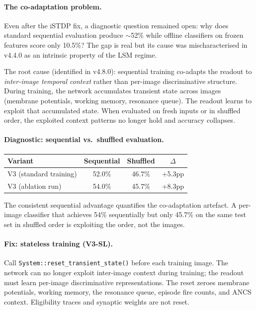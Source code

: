 \paragraph{The co-adaptation problem.}
Even after the iSTDP fix, a diagnostic question remained open: why does standard sequential evaluation produce $\sim$52\% while offline classifiers on frozen features score only 10.5\%? The gap is real but its cause was mischaracterised in v4.4.0 as an intrinsic property of the LSM regime.

The root cause (identified in v4.8.0): sequential training co-adapts the readout to \emph{inter-image temporal context} rather than per-image discriminative structure. During training, the network accumulates transient state across images (membrane potentials, working memory, resonance queue). The readout learns to exploit that accumulated state. When evaluated on fresh inputs or in shuffled order, the exploited context patterns no longer hold and accuracy collapses.

\paragraph{Diagnostic: sequential vs.\ shuffled evaluation.}

\begin{center}
\begin{tabular}{lccc}
\hline
Variant & Sequential & Shuffled & $\Delta$ \\
\hline
V3 (standard training) & 52.0\% & 46.7\% & +5.3pp \\
V3 (ablation run)      & 54.0\% & 45.7\% & +8.3pp \\
\hline
\end{tabular}
\end{center}

The consistent sequential advantage quantifies the co-adaptation artefact. A per-image classifier that achieves 54\% sequentially but only 45.7\% on the same test set in shuffled order is exploiting the order, not the images.

\paragraph{Fix: stateless training (V3-SL).}
Call \texttt{System::reset\_transient\_state()} before each training image. The network can no longer exploit inter-image context during training; the readout must learn per-image discriminative representations. The reset zeroes membrane potentials, working memory, the resonance queue, episode fire counts, and ANCS context. Eligibility traces and synaptic weights are not reset.

